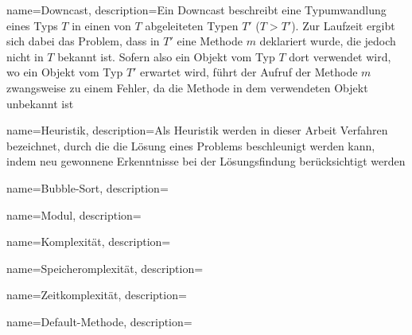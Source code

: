 {
    name=Downcast,
    description={Ein Downcast beschreibt eine Typumwandlung eines Typs $T$ in einen von $T$ abgeleiteten Typen $T'$ ($T > T'$). Zur Laufzeit ergibt sich dabei das Problem, dass in $T'$ eine Methode $m$ deklariert wurde, die jedoch nicht in $T$ bekannt ist. Sofern also ein Objekt vom Typ $T$ dort verwendet wird, wo ein Objekt vom Typ $T'$ erwartet wird, führt der Aufruf der Methode $m$ zwangsweise zu einem Fehler, da die Methode in dem verwendeten Objekt unbekannt ist
}}

{
    name=Heuristik,
    description={Als Heuristik werden in dieser Arbeit Verfahren bezeichnet, durch die die Lösung eines Problems beschleunigt werden kann, indem neu gewonnene Erkenntnisse bei der Lösungsfindung berücksichtigt werden}
   }

{
    name=Bubble-Sort,
    description={}
}

{
    name=Modul,
    description={}
}

{
    name=Komplexität,
    description={}
}


{
    name=Speicheromplexität,
    description={}
}


{
    name=Zeitkomplexität,
    description={}
}

{
    name=Default-Methode,
    description={}
}
